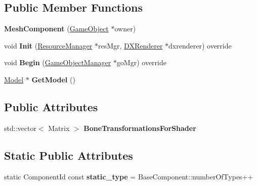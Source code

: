 \subsection*{Public Member Functions}
\begin{DoxyCompactItemize}
\item 
\mbox{\label{classMeshComponent_ab67426ad3bbc1396606668eb79af31e4}} 
{\bfseries Mesh\+Component} (\hyperlink{classGameObject}{Game\+Object} $\ast$owner)
\item 
\mbox{\label{classMeshComponent_ad99787b15690dd9ae239590dcdad6993}} 
void {\bfseries Init} (\hyperlink{classResourceManager}{Resource\+Manager} $\ast$res\+Mgr, \hyperlink{classDXRenderer}{D\+X\+Renderer} $\ast$dxrenderer) override
\item 
\mbox{\label{classMeshComponent_a7ec68255fed493e34021fc15cec12581}} 
void {\bfseries Begin} (\hyperlink{classGameObjectManager}{Game\+Object\+Manager} $\ast$go\+Mgr) override
\item 
\mbox{\label{classMeshComponent_accf409e1a5f8b4b24312f5dcec217d54}} 
\hyperlink{classModel}{Model} $\ast$ {\bfseries Get\+Model} ()
\end{DoxyCompactItemize}
\subsection*{Public Attributes}
\begin{DoxyCompactItemize}
\item 
\mbox{\label{classMeshComponent_ae3fb9bc2df831c44b9c7eea23514bff1}} 
std\+::vector$<$ Matrix $>$ {\bfseries Bone\+Transformations\+For\+Shader}
\end{DoxyCompactItemize}
\subsection*{Static Public Attributes}
\begin{DoxyCompactItemize}
\item 
\mbox{\label{classMeshComponent_ad92895ae37febf972adbd1ad6fed1854}} 
static Component\+Id const {\bfseries static\+\_\+type} = Base\+Component\+::number\+Of\+Types++
\end{DoxyCompactItemize}
